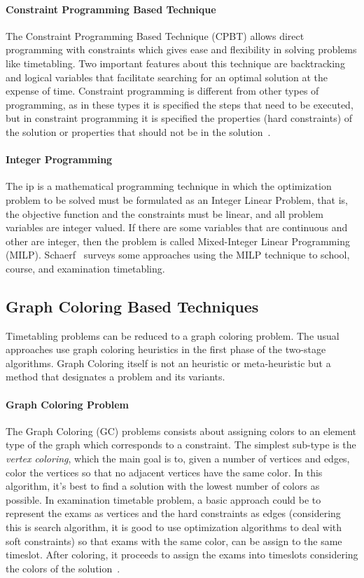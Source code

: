 \paragraph{Constraint Programming Based Technique}
The Constraint Programming Based Technique (CPBT) allows direct programming with constraints which gives ease and flexibility in solving problems like timetabling. Two important features about this technique are backtracking and logical variables that facilitate searching for an optimal solution at the expense of time. Constraint programming is different from other types of programming, as in these types it is specified the steps that need to be executed, but in constraint programming it is specified the properties (hard constraints) of the solution or properties that should not be in the solution~\cite{Qu2009}.\\

\paragraph{Integer Programming}
The \gls{ip} is a mathematical programming technique in which the optimization problem to be solved must be formulated as an Integer Linear Problem, that is, the objective function and the constraints must be linear, and all problem variables are integer valued. If there are some variables that are continuous and other are integer, then the problem is called Mixed-Integer Linear Programming (MILP). Schaerf~\cite{Schaerf1999} surveys some approaches using the MILP technique to school, course, and examination timetabling.

\subsection{Graph Coloring Based Techniques}
\label{subsection:graphcoloring}
Timetabling problems can be reduced to a graph coloring problem. The usual approaches use graph coloring heuristics in the first phase of the two-stage algorithms. Graph Coloring itself is not an heuristic or meta-heuristic but a method that designates a problem and its variants.\\

\paragraph{Graph Coloring Problem}
The Graph Coloring (GC) problems consists about assigning colors to an element type of the graph which corresponds to a constraint. The simplest sub-type is the \textit{vertex coloring}, which the main goal is to, given a number of vertices and edges, color the vertices so that no adjacent vertices have the same color. In this algorithm, it's best to find a solution with the lowest number of colors as possible. In examination timetable problem, a basic approach could be to represent the exams as vertices and the hard constraints as edges (considering this is search algorithm, it is good to use optimization algorithms to deal with soft constraints) so that exams with the same color, can be assign to the same timeslot. After coloring, it proceeds to assign the exams into timeslots considering the colors of the solution~\cite{Qu2009}.\\

